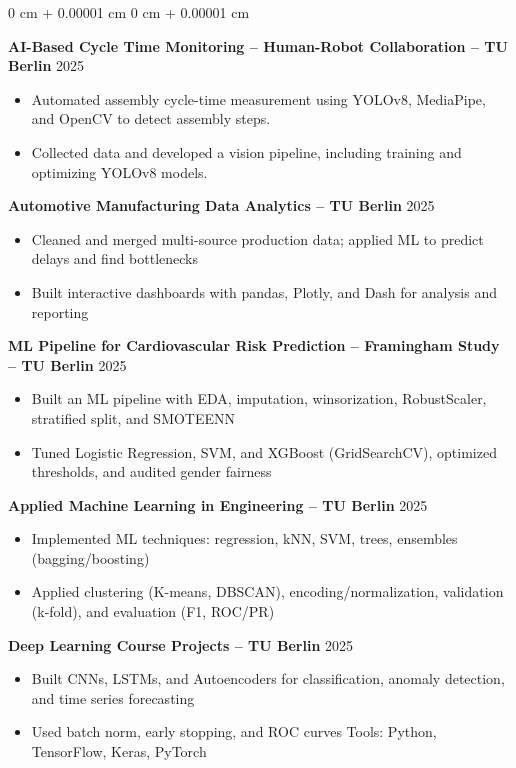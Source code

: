\documentclass[10pt, letterpaper]{article}
\newenvironment{highlights}{
    \begin{itemize}[
        topsep=0.10 cm,
        parsep=0.10 cm,
        partopsep=0pt,
        itemsep=0pt,
        leftmargin=0 cm + 10pt
    ]
}{
    \end{itemize}
} %
\newenvironment{onecolentry}{
    \begin{adjustwidth}{
        0 cm + 0.00001 cm
    }{
        0 cm + 0.00001 cm
    }
}{
    \end{adjustwidth}
} %
\begin{document}
\begin{onecolentry}
\textbf{AI-Based Cycle Time Monitoring – Human-Robot Collaboration – TU Berlin} \hfill \textsc{2025} \\
\begin{highlights}
  \item Automated assembly cycle-time measurement using YOLOv8, MediaPipe, and OpenCV to detect assembly steps.
  \item Collected data and developed a vision pipeline, including training and optimizing YOLOv8 models.
\end{highlights}

\textbf{Automotive Manufacturing Data Analytics – TU Berlin} \hfill \textsc{\phantom{202}2025} \\
\begin{highlights}
  \item Cleaned and merged multi-source production data; applied ML to predict delays and find bottlenecks
  \item Built interactive dashboards with pandas, Plotly, and Dash for analysis and reporting
\end{highlights}


\textbf{ML Pipeline for Cardiovascular Risk Prediction – Framingham Study – TU Berlin} \hfill \textsc{\phantom{202}2025} \\
\begin{highlights}
  \item Built an ML pipeline with EDA, imputation, winsorization, RobustScaler, stratified split, and SMOTEENN
  \item Tuned Logistic Regression, SVM, and XGBoost (GridSearchCV), optimized thresholds, and audited gender fairness
\end{highlights}
\textbf{Applied Machine Learning in Engineering – TU Berlin} \hfill \textsc{2025}\\
\begin{highlights}
  \item Implemented ML techniques: regression, kNN, SVM, trees, ensembles (bagging/boosting)
  \item Applied clustering (K-means, DBSCAN), encoding/normalization, validation (k-fold), and evaluation (F1, ROC/PR)
\end{highlights}

\textbf{Deep Learning Course Projects – TU Berlin} \hfill \textsc{\phantom{202}2025} \\
\begin{highlights}
  \item Built CNNs, LSTMs, and Autoencoders for classification, anomaly detection, and time series forecasting
  \item Used batch norm, early stopping, and ROC curves \textbullet{} Tools: Python, TensorFlow, Keras, PyTorch
\end{highlights}





\end{onecolentry}
\end{document}
